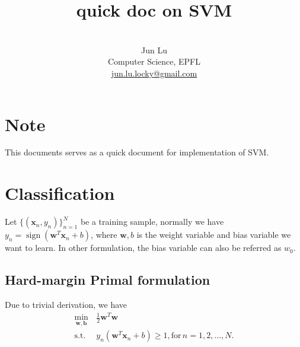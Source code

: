 \documentclass[11pt, a4paper, reqno, twoside]{scrartcl}
\theoremstyle{style}
\DeclareMathOperator*{\sign}{sign}
\newcommand{\x}{\bm{x}}
\newcommand{\wv}{\bm{w}}
\newcommand{\0}{\mathbf{0}} %
\newcommand{\bw}{\bm{w}}
\newcommand{\bx}{\bm{x}}
\newcommand{\bb}{\bm{b}}
\begin{document}
\pagestyle{fancy}



\title{quick doc on SVM}

\author{\\ Jun Lu\\
{\small Computer Science, EPFL}\\
{\small \href{mailto:jun.lu.locky@gmail.com}{jun.lu.locky@gmail.com}}}
\date{}


\maketitle


 
%

\section{Note}
This documents serves as a quick document for implementation of SVM.

\section{Classification}
Let $\{(\bx_n, y_n)\}_{n = 1}^N$ be a training sample, normally we have $y_n = \sign(\bw^T \bx_n + b)$, where $\bw, b$ is the weight variable and bias variable we want to learn. In other formulation, the bias variable can also be referred as $w_0$.

\subsection{Hard-margin Primal formulation}
Due to trivial derivation, we have
\begin{equation}
\begin{aligned}
\min_{\bw,\bb} \, &\frac{1}{2} \bw^T \bw\\
\mathrm{s.t. }   \,                & y_n (\bw^T \bx_n + b) \geq 1, \mathrm{for }\,  n=1, 2, \ldots, N. 
\end{aligned}
\end{equation}
\end{document}
